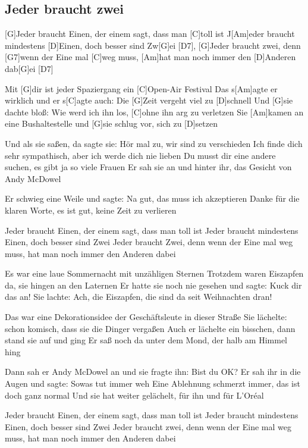 \subsection*{Jeder braucht zwei   }
\begin{guitar}

[G]Jeder braucht Einen, der einem sagt, dass man [C]toll ist
J[Am]eder braucht mindestens [D]Einen, doch besser sind Zw[G]ei [D7],
[G]Jeder braucht zwei, denn [G7]wenn der Eine mal [C]weg muss,
[Am]hat man noch immer den [D]Anderen dab[G]ei [D7] $\;$



Mit [G]dir ist jeder Spaziergang ein [C]Open-Air Festival
Das s[Am]agte er wirklich und er s[C]agte auch: Die [G]Zeit vergeht viel zu [D]schnell
Und [G]sie dachte bloß: Wie werd ich ihn los, [C]ohne ihn arg zu verletzen
Sie [Am]kamen an eine Bushaltestelle und [G]sie schlug vor, sich zu [D]setzen



Und als sie saßen, da sagte sie: Hör mal zu, wir sind zu verschieden
Ich finde dich sehr sympathisch, aber ich werde dich nie lieben
Du musst dir eine andere suchen, es gibt ja so viele Frauen
Er sah sie an und hinter ihr, das Gesicht von Andy McDowel


Er schwieg eine Weile und sagte: Na gut, das muss ich akzeptieren
Danke für die klaren Worte, es ist gut, keine Zeit zu verlieren


Jeder braucht Einen, der einem sagt, dass man toll ist
Jeder braucht mindestens Einen, doch besser sind Zwei
Jeder braucht Zwei, denn wenn der Eine mal weg muss,
hat man noch immer den Anderen dabei


Es war eine laue Sommernacht mit unzähligen Sternen
Trotzdem waren Eiszapfen da, sie hingen an den Laternen
Er hatte sie noch nie gesehen und sagte: Kuck dir das an!
Sie lachte: Ach, die Eiszapfen, die sind da seit Weihnachten dran!


Das war eine Dekorationsidee der Geschäftsleute in dieser Straße
Sie lächelte: schon komisch, dass sie die Dinger vergaßen
Auch er lächelte ein bisschen, dann stand sie auf und ging
Er saß noch da unter dem Mond, der halb am Himmel hing


Dann sah er Andy McDowel an und sie fragte ihn: Bist du OK?
Er sah ihr in die Augen und sagte: Sowas tut immer weh
Eine Ablehnung schmerzt immer, das ist doch ganz normal
Und sie hat weiter gelächelt, für ihn und für L'Oréal


Jeder braucht Einen, der einem sagt, dass man toll ist
Jeder braucht mindestens Einen, doch besser sind Zwei
Jeder braucht zwei, denn wenn der Eine mal weg muss,
hat man noch immer den Anderen dabei
\end{guitar}
